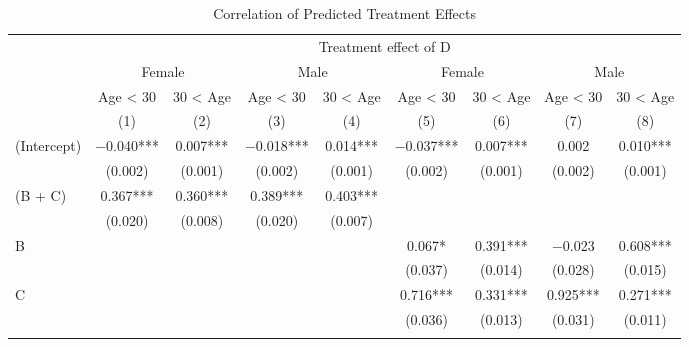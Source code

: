 \documentclass[
]{article}
\begin{document}
\begin{table}

\caption{\label{tab:rcf-int-corr}Correlation of Predicted Treatment Effects}
\centering
\fontsize{9}{11}\selectfont
\begin{threeparttable}
\begin{tabular}[t]{lcccccccc}
\toprule
\multicolumn{1}{c}{ } & \multicolumn{8}{c}{Treatment effect of D} \\
\cmidrule(l{3pt}r{3pt}){2-9}
\multicolumn{1}{c}{ } & \multicolumn{2}{c}{Female} & \multicolumn{2}{c}{Male} & \multicolumn{2}{c}{Female} & \multicolumn{2}{c}{Male} \\
\cmidrule(l{3pt}r{3pt}){2-3} \cmidrule(l{3pt}r{3pt}){4-5} \cmidrule(l{3pt}r{3pt}){6-7} \cmidrule(l{3pt}r{3pt}){8-9}
\multicolumn{1}{c}{ } & \multicolumn{1}{c}{Age < 30} & \multicolumn{1}{c}{30 < Age} & \multicolumn{1}{c}{Age < 30} & \multicolumn{1}{c}{30 < Age} & \multicolumn{1}{c}{Age < 30} & \multicolumn{1}{c}{30 < Age} & \multicolumn{1}{c}{Age < 30} & \multicolumn{1}{c}{30 < Age} \\
\cmidrule(l{3pt}r{3pt}){2-2} \cmidrule(l{3pt}r{3pt}){3-3} \cmidrule(l{3pt}r{3pt}){4-4} \cmidrule(l{3pt}r{3pt}){5-5} \cmidrule(l{3pt}r{3pt}){6-6} \cmidrule(l{3pt}r{3pt}){7-7} \cmidrule(l{3pt}r{3pt}){8-8} \cmidrule(l{3pt}r{3pt}){9-9}
  & (1) & (2) & (3) & (4) & (5) & (6) & (7) & (8)\\
\midrule
(Intercept) & \num{-0.040}*** & \num{0.007}*** & \num{-0.018}*** & \num{0.014}*** & \num{-0.037}*** & \num{0.007}*** & \num{0.002} & \num{0.010}***\\
 & (\num{0.002}) & (\num{0.001}) & (\num{0.002}) & (\num{0.001}) & (\num{0.002}) & (\num{0.001}) & (\num{0.002}) & (\num{0.001})\\
(B + C) & \num{0.367}*** & \num{0.360}*** & \num{0.389}*** & \num{0.403}*** &  &  &  & \\
 & (\num{0.020}) & (\num{0.008}) & (\num{0.020}) & (\num{0.007}) &  &  &  \vphantom{1} & \\
B &  &  &  &  & \num{0.067}* & \num{0.391}*** & \num{-0.023} & \num{0.608}***\\
 &  &  &  &  & (\num{0.037}) & (\num{0.014}) & (\num{0.028}) & (\num{0.015})\\
C &  &  &  &  & \num{0.716}*** & \num{0.331}*** & \num{0.925}*** & \num{0.271}***\\
 &  &  &  &  & (\num{0.036}) & (\num{0.013}) & (\num{0.031}) & (\num{0.011})\\
\addlinespace[0.3em]
\multicolumn{9}{l}{\textit{Linear combination test (F-test)}}\\

\end{tabular}
\end{threeparttable}
\end{table}
\end{document}
